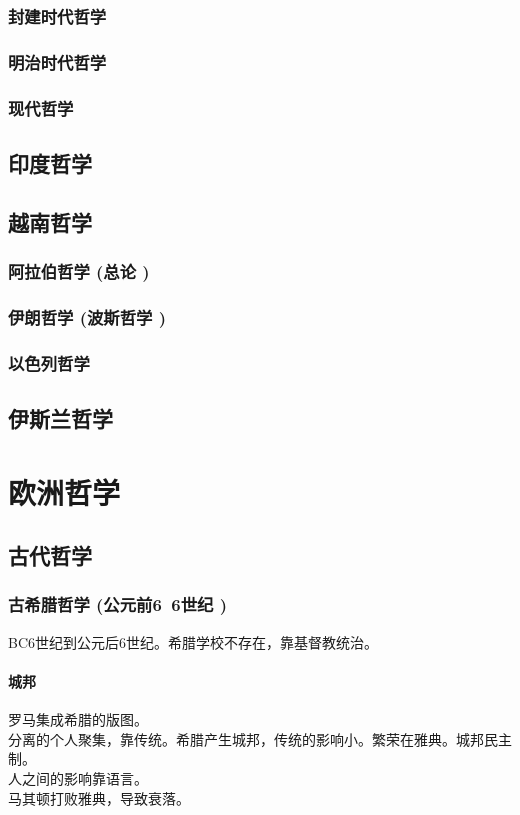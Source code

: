 \documentclass[UTF8]{../RepresentationUniverse}
\begin{document}
    \subsubsection{封建时代哲学}
    \subsubsection{明治时代哲学}
    \subsubsection{现代哲学}

    
\subsection{印度哲学}
\subsection{越南哲学}
    
\subsubsection{阿拉伯哲学 (总论 )}
\subsubsection{伊朗哲学 (波斯哲学 )}
\subsubsection{以色列哲学}


\subsection{伊斯兰哲学}




\section{欧洲哲学}
\subsection{古代哲学}
    \subsubsection{古希腊哲学 (公元前6~6世纪 )}
    BC6世纪到公元后6世纪。希腊学校不存在，靠基督教统治。

    \paragraph{城邦}
    罗马集成希腊的版图。\\
    分离的个人聚集，靠传统。希腊产生城邦，传统的影响小。繁荣在雅典。城邦民主制。\\
    人之间的影响靠语言。\\
    马其顿打败雅典，导致衰落。\\
\end{document}
